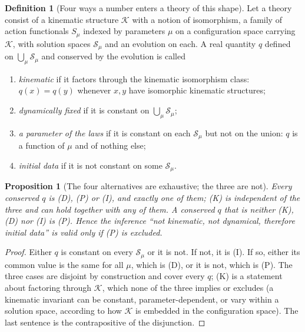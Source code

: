 \documentclass[11pt]{article}
\newtheorem{proposition}[theorem]{Proposition}
\theoremstyle{definition}
\newtheorem{definition}[theorem]{Definition}
\begin{document}
\begin{definition}[Four ways a number enters a theory of this shape]\label{def:fourways}
Let a theory consist of a kinematic structure $\mathcal{K}$ with a notion of isomorphism, a family of action functionals $S_\mu$ indexed by parameters $\mu$ on a configuration space carrying $\mathcal{K}$, with solution spaces $\mathcal{S}_\mu$ and an evolution on each. A real quantity $q$ defined on $\bigcup_\mu \mathcal{S}_\mu$ and conserved by the evolution is called
\begin{enumerate}
\item[(K)] \emph{kinematic} if it factors through the kinematic isomorphism class: $q(x) = q(y)$ whenever $x, y$ have isomorphic kinematic structures;
\item[(D)] \emph{dynamically fixed} if it is constant on $\bigcup_\mu \mathcal{S}_\mu$;
\item[(P)] \emph{a parameter of the laws} if it is constant on each $\mathcal{S}_\mu$ but not on the union: $q$ is a function of $\mu$ and of nothing else;
\item[(I)] \emph{initial data} if it is not constant on some $\mathcal{S}_\mu$.
\end{enumerate}
\end{definition}

\begin{proposition}[The four alternatives are exhaustive; the three are not]\label{prop:exhaustive}
Every conserved $q$ is (D), (P) or (I), and exactly one of them; (K) is independent of the three and can hold together with any of them. A conserved $q$ that is neither (K), (D) nor (I) is (P). Hence the inference ``not kinematic, not dynamical, therefore initial data'' is valid only if (P) is excluded.
\end{proposition}

\begin{proof}
Either $q$ is constant on every $\mathcal{S}_\mu$ or it is not. If not, it is (I). If so, either its common value is the same for all $\mu$, which is (D), or it is not, which is (P). The three cases are disjoint by construction and cover every $q$; (K) is a statement about factoring through $\mathcal{K}$, which none of the three implies or excludes (a kinematic invariant can be constant, parameter-dependent, or vary within a solution space, according to how $\mathcal{K}$ is embedded in the configuration space). The last sentence is the contrapositive of the disjunction.
\end{proof}
\end{document}
